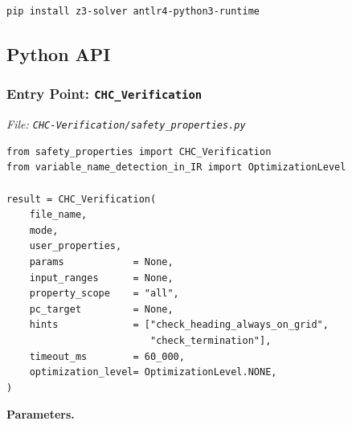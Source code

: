 \begin{lstlisting}[style=terminal]
pip install z3-solver antlr4-python3-runtime
\end{lstlisting}

\subsection*{Python API}

\subsubsection*{Entry Point: \texttt{CHC\_Verification}}
\vspace{-2mm}
\noindent\textit{\small File: \texttt{CHC-Verification/safety\_properties.py}}

\begin{lstlisting}[style=terminal]
from safety_properties import CHC_Verification
from variable_name_detection_in_IR import OptimizationLevel

result = CHC_Verification(
    file_name,
    mode,
    user_properties,
    params            = None,
    input_ranges      = None,
    property_scope    = "all",
    pc_target         = None,
    hints             = ["check_heading_always_on_grid",
                         "check_termination"],
    timeout_ms        = 60_000,
    optimization_level= OptimizationLevel.NONE,
)
\end{lstlisting}

\noindent\textbf{Parameters.}


